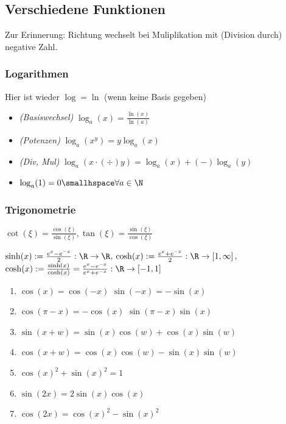 \newpage
\subsection{Verschiedene Funktionen}
\shortremark[Ungleichungen] Zur Erinnerung: Richtung wechselt bei Muliplikation mit (Division durch) negative Zahl.

\subsubsection{Logarithmen}
Hier ist wieder $\log = \ln$ (wenn keine Basis gegeben)
\begin{itemize}
    \item \textit{(Basiswechsel)} $\log_a(x) = \frac{\ln(x)}{\ln(a)}$
    \item \textit{(Potenzen)} $\log_a(x^y) = y\log_a(x)$
    \item \textit{(Div, Mul)} $\log_a(x \cdot (\div) y) = \log_a(x) +(-) \log_a(y)$
    \item $\log_a(1) = 0 \smallhspace \forall a \in \N$
\end{itemize}


\subsubsection{Trigonometrie}
$\cot(\xi) = \displaystyle\frac{\cos(\xi)}{\sin(\xi)}, \tan(\xi) = \frac{\sin(\xi)}{\cos(\xi)}$

$\sinh(x) := \frac{e^x - e^{-x}}{2} : \R \rightarrow \R$,
$\cosh(x) := \frac{e^x + e^{-x}}{2} : \R \rightarrow [1, \infty]$,
$\cosh(x) := \frac{\sinh(x)}{\cosh(x)} = \frac{e^x - e^{-x}}{e^x + e^{-x}} : \R \rightarrow [-1, 1]$

\begin{enumerate}
    \item $\cos(x) = \cos(-x)$ \trand $\sin(-x) = -\sin(x)$
    \item $\cos(\pi - x) = -\cos(x)$ \trand $\sin(\pi - x) \sin(x)$
    \item $\sin(x + w) = \sin(x) \cos(w) + \cos(x) \sin(w)$
    \item $\cos(x + w) = \cos(x) \cos(w) - \sin(x) \sin(w)$
    \item $\cos(x)^2 + \sin(x)^2 = 1$
    \item $\sin(2x) = 2 \sin(x) \cos(x)$
    \item $\cos(2x) = \cos(x)^2 - \sin(x)^2$
\end{enumerate}


